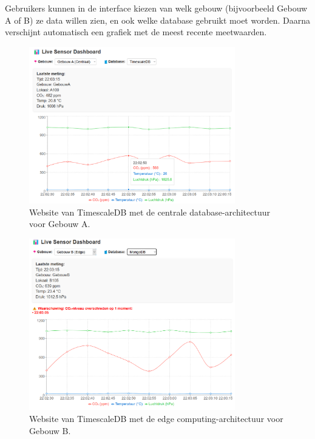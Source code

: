 Gebruikers kunnen in de interface kiezen van welk gebouw (bijvoorbeeld Gebouw A of B) ze data willen zien, en ook welke database gebruikt moet worden. Daarna verschijnt automatisch een grafiek met de meest recente meetwaarden.

\begin{figure}[H]
	\centering
	\includegraphics[width=0.8\textwidth]{GebouwA_TimeScale_Website.png}
	\caption{Website van TimescaleDB met de centrale database-architectuur voor Gebouw A.}
    \label{fig:gebouw-a-architecture}
\end{figure}

\begin{figure}[H]
    \centering
    \includegraphics[width=0.8\textwidth]{GebouwB_MongoDb_Website.png}
    \caption{Website van TimescaleDB met de edge computing-architectuur voor Gebouw B.}
    \label{fig:gebouw-b-architecture}
\end{figure}

